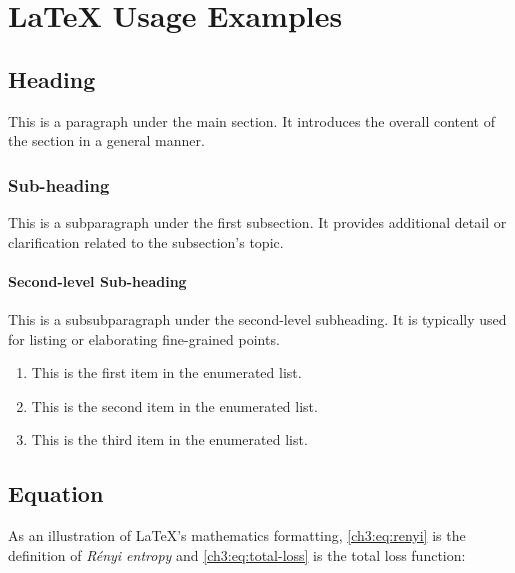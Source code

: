 \chapter{LaTeX Usage Examples}
\label{chapter3}

\section{Heading}
\begin{paragraph}
This is a paragraph under the main section. It introduces the overall content of the section in a general manner.
\end{paragraph}

\subsection{Sub-heading}
\begin{subparagraph}
This is a subparagraph under the first subsection. It provides additional detail or clarification related to the subsection's topic.
\end{subparagraph}

\subsubsection{Second-level Sub-heading}
\begin{subsubparagraph}
This is a subsubparagraph under the second-level subheading. It is typically used for listing or elaborating fine-grained points.
\end{subsubparagraph}

\begin{enumerate}[itemindent=\subsubparitemindent]
    \item This is the first item in the enumerated list.
    \item This is the second item in the enumerated list.
    \item This is the third item in the enumerated list.
\end{enumerate}

\section{Equation}
\begin{paragraph}
As an illustration of \LaTeX's mathematics formatting, \autoref{ch3:eq:renyi} is the definition of {\em R\'enyi entropy} and \autoref{ch3:eq:total-loss} is the total loss function:
\end{paragraph}

